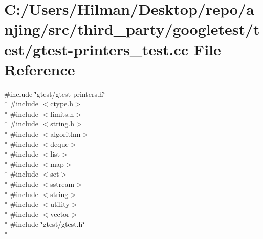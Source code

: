 \hypertarget{gtest-printers__test_8cc}{}\section{C\+:/\+Users/\+Hilman/\+Desktop/repo/anjing/src/third\+\_\+party/googletest/test/gtest-\/printers\+\_\+test.cc File Reference}
\label{gtest-printers__test_8cc}
{\ttfamily \#include \char`\"{}gtest/gtest-\/printers.\+h\char`\"{}}\\*
{\ttfamily \#include $<$ctype.\+h$>$}\\*
{\ttfamily \#include $<$limits.\+h$>$}\\*
{\ttfamily \#include $<$string.\+h$>$}\\*
{\ttfamily \#include $<$algorithm$>$}\\*
{\ttfamily \#include $<$deque$>$}\\*
{\ttfamily \#include $<$list$>$}\\*
{\ttfamily \#include $<$map$>$}\\*
{\ttfamily \#include $<$set$>$}\\*
{\ttfamily \#include $<$sstream$>$}\\*
{\ttfamily \#include $<$string$>$}\\*
{\ttfamily \#include $<$utility$>$}\\*
{\ttfamily \#include $<$vector$>$}\\*
{\ttfamily \#include \char`\"{}gtest/gtest.\+h\char`\"{}}\\*
